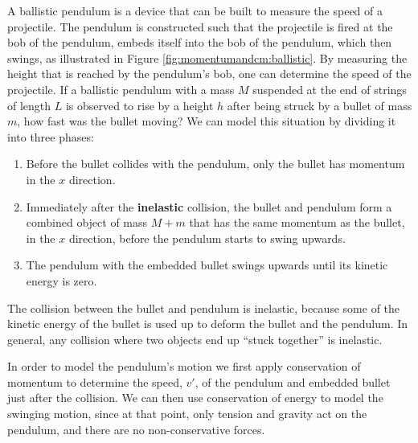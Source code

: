 \begin{example}{
A ballistic pendulum is a device that can be built to measure the speed of a projectile. The pendulum is constructed such that the projectile is fired at the bob of the pendulum, embeds itself into the bob of the pendulum, which then swings, as illustrated in Figure \ref{fig:momentumandcm:ballistic}. By measuring the height that is reached by the pendulum's bob, one can determine the speed of the projectile. If a ballistic pendulum with a mass $M$ suspended at the end of strings of length $L$ is observed to rise by a height $h$ after being struck by a bullet of mass $m$, how fast was the bullet moving?}
We can model this situation by dividing it into three phases:
\begin{enumerate}
\item Before the bullet collides with the pendulum, only the bullet has momentum in the $x$ direction.
\item Immediately after the \textbf{inelastic} collision, the bullet and pendulum form a combined object of mass $M+m$ that has the same momentum as the bullet, in the $x$ direction, before the pendulum starts to swing upwards.
\item The pendulum with the embedded bullet swings upwards until its kinetic energy is zero.
\end{enumerate}
The collision between the bullet and pendulum is inelastic, because some of the kinetic energy of the bullet is used up to deform the bullet and the pendulum. In general, any collision where two objects end up ``stuck together'' is inelastic.

In order to model the pendulum's motion we first apply conservation of momentum to determine the speed, $v'$, of the pendulum and embedded bullet just after the collision. We can then use conservation of energy to model the swinging motion, since at that point, only tension and gravity act on the pendulum, and there are no non-conservative forces.


\end{example}
